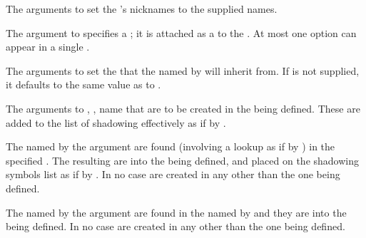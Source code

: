 \beginlist
{}

The arguments to  set the 's nicknames to the
supplied names.
 

The argument to  specifies a ;
it is attached as a  to the .
At most one  option 
can appear in a single  .


The arguments to  set the  that the 
named by 
will inherit from. If  is not supplied,
it defaults to the same  value as  to
.
 

The arguments to , , name  
that are to be created in the  being defined.
These  are added to the list of shadowing
 effectively as if by .
 

The  named by the argument 
are found (involving a lookup as if by )
in the specified .  The resulting 
are  into the  being defined, and 
placed on the shadowing symbols list as if by .
In no case are  created in any 
other than the one being defined.
 

The  named by the argument 
are found in the  named by  and 
they are  into the  being defined.
In no case are  created in any 
other than the one being defined.
 
